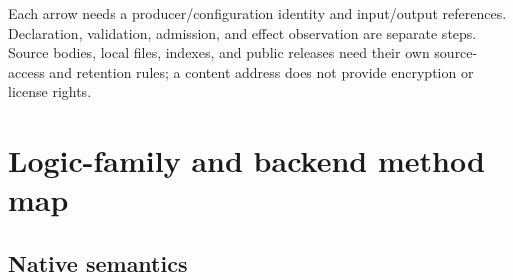 \documentclass{article}
\begin{document}
Each arrow needs a producer/configuration identity and input/output references. Declaration, validation, admission, and effect observation are separate steps. Source bodies, local files, indexes, and public releases need their own source-access and retention rules; a content address does not provide encryption or license rights.

\section{Logic-family and backend method map}

\subsection{Native semantics}
\begingroup
\renewcommand{\thetable}{B1}
\end{document}
